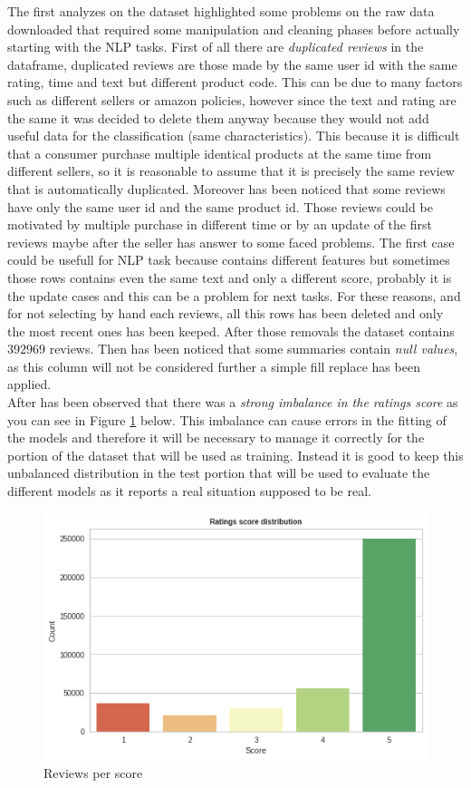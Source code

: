 \documentclass[11pt]{article}
\begin{document}
The first analyzes on the dataset highlighted some problems on the raw data downloaded that required some manipulation and cleaning phases before actually starting with the NLP tasks. First of all there are \textit{duplicated reviews} in the dataframe, duplicated reviews are those made by the same user id with the same rating, time and text but different product code. This can be due to many factors such as different sellers or amazon policies, however since the text and rating are the same it was decided to delete them anyway because they would not add useful data for the classification (same characteristics). This because it is difficult that a consumer purchase multiple identical products at the same time from different sellers, so it is reasonable to assume that it is precisely the same review that is automatically duplicated. Moreover has been noticed that some reviews have only the same user id and the same product id. Those reviews could be motivated by multiple purchase in different time or by an update of the first reviews maybe after the seller has answer to some faced problems. The first case could be usefull for NLP task because contains different features but sometimes those rows contains even the same text and only a different score, probably it is the update cases and this can be a problem for next tasks. For these reasons, and for not selecting by hand each reviews, all this rows has been deleted and only the most recent ones has been keeped. After those removals the dataset contains $392969$ reviews. Then has been noticed that some summaries contain \textit{null values}, as this column will not be considered further a simple fill replace has been applied. \\
After has been observed that there was a \textit{strong imbalance in the ratings score} as you can see in Figure \ref{scoreImb} below. This imbalance can cause errors in the fitting of the models and therefore it will be necessary to manage it correctly for the portion of the dataset that will be used as training. Instead it is good to keep this unbalanced distribution in the test portion that will be used to evaluate the different models as it reports a real situation supposed to be real. 
\begin{figure}[H]
\begin{center}
  \includegraphics[scale = 0.55]{imbalance.png}
  \caption{Reviews per score}
  \label{scoreImb}
\end{center}
\end{figure}
\end{document}
